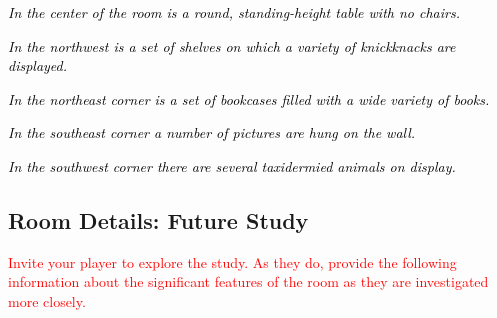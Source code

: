 \documentclass[a6paper, parskip=half, DIV=14, 12pt]{scrartcl}
\begin{document}
\textcolor{black}{\textit{In the center of the room is a round, standing-height table with no chairs.}}

\textcolor{black}{\textit{In the northwest is a set of shelves on which a variety of knickknacks are displayed.}}

\textcolor{black}{\textit{In the northeast corner is a set of bookcases filled with a wide variety of books.}}

\textcolor{black}{\textit{In the southeast corner a number of pictures are hung on the wall.}}

\textcolor{black}{\textit{In the southwest corner there are several taxidermied animals on display.}}

\newpage

\subsection*{Room Details: Future Study}
\textcolor{Red}{Invite your player to explore the study. As they do, provide the following information about the significant features of the room as they are investigated more closely.}
\end{document}
